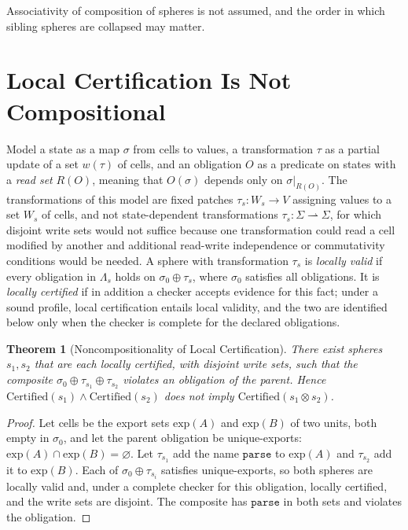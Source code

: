 \documentclass[12pt,oneside,openany]{book}
\theoremstyle{spherepop}
\newtheorem{theorem}[definition]{Theorem}
\theoremstyle{remarkstyle}
\begin{document}
Associativity of composition of spheres is not assumed, and the order in which sibling spheres are collapsed may matter.

\section{Local Certification Is Not Compositional}

Model a state as a map $\sigma$ from cells to values, a transformation $\tau$ as a partial update of a set $w(\tau)$ of cells, and an obligation $O$ as a predicate on states with a \emph{read set} $R(O)$, meaning that $O(\sigma)$ depends only on $\sigma|_{R(O)}$. The transformations of this model are fixed patches $\tau_s:W_s\to V$ assigning values to a set $W_s$ of cells, and not state-dependent transformations $\tau_s:\Sigma\rightharpoonup\Sigma$, for which disjoint write sets would not suffice because one transformation could read a cell modified by another and additional read-write independence or commutativity conditions would be needed. A sphere with transformation $\tau_s$ is \emph{locally valid} if every obligation in $\Lambda_s$ holds on $\sigma_0\oplus\tau_s$, where $\sigma_0$ satisfies all obligations. It is \emph{locally certified} if in addition a checker accepts evidence for this fact; under a sound profile, local certification entails local validity, and the two are identified below only when the checker is complete for the declared obligations.

\begin{theorem}[Noncompositionality of Local Certification]
\label{thm:noncompositional}
There exist spheres $s_1,s_2$ that are each locally certified, with disjoint write sets, such that the composite $\sigma_0\oplus\tau_{s_1}\oplus\tau_{s_2}$ violates an obligation of the parent. Hence $\mathrm{Certified}(s_1)\wedge\mathrm{Certified}(s_2)$ does not imply $\mathrm{Certified}(s_1\otimes s_2)$.
\end{theorem}

\begin{proof}
Let cells be the export sets $\mathrm{exp}(A)$ and $\mathrm{exp}(B)$ of two units, both empty in $\sigma_0$, and let the parent obligation be \textsf{unique-exports}: $\mathrm{exp}(A)\cap\mathrm{exp}(B)=\varnothing$. Let $\tau_{s_1}$ add the name $\mathtt{parse}$ to $\mathrm{exp}(A)$ and $\tau_{s_2}$ add it to $\mathrm{exp}(B)$. Each of $\sigma_0\oplus\tau_{s_i}$ satisfies \textsf{unique-exports}, so both spheres are locally valid and, under a complete checker for this obligation, locally certified, and the write sets are disjoint. The composite has $\mathtt{parse}$ in both sets and violates the obligation.
\end{proof}
\end{document}
